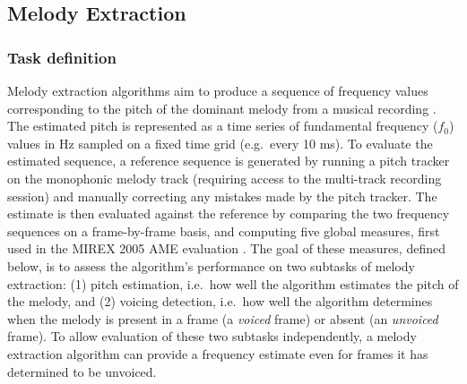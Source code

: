 \documentclass{article}
\begin{document}
\subsection{Melody Extraction}
\subsubsection{Task definition}
Melody extraction algorithms aim to produce a sequence of frequency values
corresponding to the pitch of the dominant melody from a musical recording
\cite{salamon:MelodyReview:IEEESPM13}. The estimated pitch is represented as a
time series of fundamental frequency ($f_0$) values in Hz sampled on a fixed
time grid (e.g.~every 10 ms). To evaluate the estimated sequence, a reference
sequence is generated by running a pitch tracker on the monophonic melody track
(requiring access to the multi-track recording session) and manually correcting
any mistakes made by the pitch tracker. The estimate is then evaluated against
the reference by comparing the two frequency sequences on a frame-by-frame
basis, and computing five global measures, first used in the MIREX 2005 AME
evaluation \cite{polinerMelodyEval}. The goal of these measures, defined below,
is to assess the algorithm's performance on two subtasks of melody extraction:
(1) pitch estimation, i.e.~how well the algorithm estimates the pitch of the
melody, and (2) voicing detection, i.e.~how well the algorithm determines when
the melody is present in a frame (a \textit{voiced} frame) or absent (an
\textit{unvoiced} frame). To allow evaluation of these two subtasks
independently, a melody extraction algorithm can provide a frequency estimate
even for frames it has determined to be unvoiced.
\end{document}
